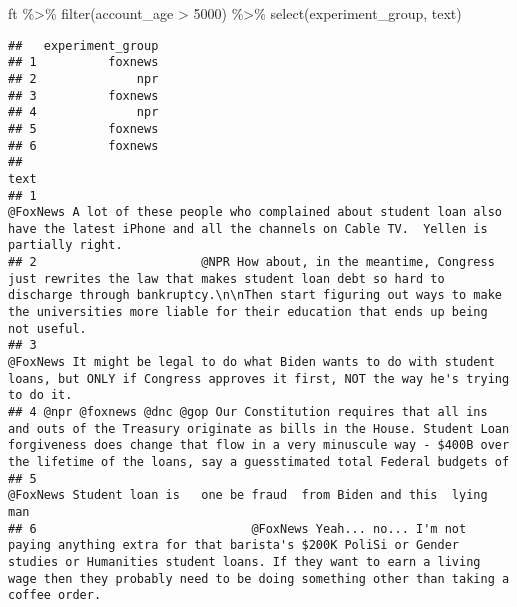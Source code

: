 \documentclass[
]{article}
\newenvironment{Shaded}{\begin{snugshade}}{\end{snugshade}}
\newcommand{\DecValTok}[1]{\textcolor[rgb]{0.00,0.00,0.81}{#1}}
\newcommand{\FunctionTok}[1]{\textcolor[rgb]{0.00,0.00,0.00}{#1}}
\newcommand{\NormalTok}[1]{#1}
\newcommand{\SpecialCharTok}[1]{\textcolor[rgb]{0.00,0.00,0.00}{#1}}
\begin{document}
\begin{Shaded}
\begin{Highlighting}[]
\NormalTok{ft }\SpecialCharTok{\%\textgreater{}\%} \FunctionTok{filter}\NormalTok{(account\_age }\SpecialCharTok{\textgreater{}} \DecValTok{5000}\NormalTok{) }\SpecialCharTok{\%\textgreater{}\%} \FunctionTok{select}\NormalTok{(experiment\_group, text)}
\end{Highlighting}
\end{Shaded}

\begin{verbatim}
##   experiment_group
## 1          foxnews
## 2              npr
## 3          foxnews
## 4              npr
## 5          foxnews
## 6          foxnews
##                                                                                                                                                                                                                                                                                  text
## 1                                                                                                                          @FoxNews A lot of these people who complained about student loan also have the latest iPhone and all the channels on Cable TV.  Yellen is partially right.
## 2                       @NPR How about, in the meantime, Congress just rewrites the law that makes student loan debt so hard to discharge through bankruptcy.\n\nThen start figuring out ways to make the universities more liable for their education that ends up being not useful.
## 3                                                                                                                               @FoxNews It might be legal to do what Biden wants to do with student loans, but ONLY if Congress approves it first, NOT the way he's trying to do it.
## 4 @npr @foxnews @dnc @gop Our Constitution requires that all ins and outs of the Treasury originate as bills in the House. Student Loan forgiveness does change that flow in a very minuscule way - $400B over the lifetime of the loans, say a guesstimated total Federal budgets of
## 5                                                                                                                                                                                                             @FoxNews Student loan is   one be fraud  from Biden and this  lying man
## 6                              @FoxNews Yeah... no... I'm not paying anything extra for that barista's $200K PoliSi or Gender studies or Humanities student loans. If they want to earn a living wage then they probably need to be doing something other than taking a coffee order.
\end{verbatim}
\end{document}
